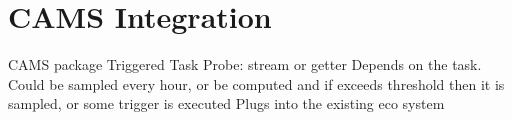 \section{CAMS Integration}
CAMS package
Triggered Task
Probe: stream or getter
Depends on the task. Could be sampled every hour, or be computed and if exceeds threshold then it is sampled, or some trigger is executed
Plugs into the existing eco system
